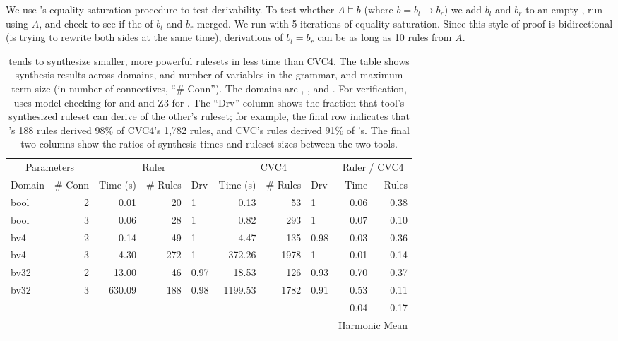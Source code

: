 We use \egg's equality saturation procedure to test derivability.
To test whether $A \vDash b$ (where $b = b_l \to b_r$)
 we add $b_l$ and $b_r$ to an empty \egraph,
 run \eqsat using $A$,
 and check to see if the \eclasses of $b_l$ and $b_r$
 merged.
We run \egg with 5 iterations of equality saturation.
Since this style of proof is bidirectional
 (\egg is trying to rewrite both sides at the same time),
 derivations of $b_l = b_r$ can be as long as 10
 rules from $A$.

\begin{table}
  \centering
  \begin{tabular}{lr|rrl|rrl|rr}
        \multicolumn{2}{c}{Parameters} &
        \multicolumn{3}{c}{Ruler} &
        \multicolumn{3}{c}{CVC4} &
        \multicolumn{2}{c}{Ruler / CVC4}
        \\
        Domain & \# Conn &
        Time (s) & \# Rules & Drv &
        Time (s) & \# Rules & Drv &
        Time & Rules
        \\
        \hline
bool & 2 & 0.01 & 20 & 1 & 0.13 & 53 & 1 & 0.06 & 0.38\\
bool & 3 & 0.06 & 28 & 1 & 0.82 & 293 & 1 & 0.07 & 0.10\\
bv4  & 2 & 0.14 & 49 & 1 & 4.47 & 135 & 0.98 & 0.03 & 0.36\\
bv4  & 3 & 4.30 & 272 & 1 & 372.26 & 1978 & 1 & 0.01 & 0.14\\
bv32 & 2 & 13.00 & 46 & 0.97 & 18.53 & 126 & 0.93 & 0.70 & 0.37\\
bv32 & 3 & 630.09 & 188 & 0.98 & 1199.53 & 1782 & 0.91 & 0.53 & 0.11\\
\hline
\multicolumn{8}{r|}{} & 0.04 & 0.17 \\
\multicolumn{8}{r}{} & \multicolumn{2}{r}{Harmonic Mean}
    \end{tabular}
    \vspace{1em}
  \caption{
     tends to synthesize smaller, more powerful rulesets in less
     time than CVC4.
    The table shows synthesis results
     across domains,
     and number of variables in the grammar,
     and maximum term size (in number of connectives, ``\# Conn'').
    The domains are \booleans, \bfour, and \bthreetwo.
    For verification,  uses model checking for \booleans and \bfour
     and Z3 for \bthreetwo.
    The ``Drv'' column shows the fraction
     that tool's synthesized ruleset can derive of the other's ruleset;
     for example, the final row indicates that
     's 188 rules derived 98\% of CVC4's 1,782 rules,
     and CVC's rules derived 91\% of 's.
    The final two columns show the ratios of
     synthesis times and ruleset sizes between the two tools.
  }
  \label{tab:ruler-eval}
\end{table}

